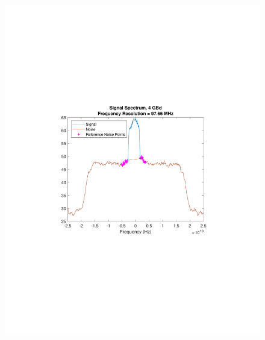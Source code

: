 \begin{refsection}
\begin{figure}[H]
	\begin{minipage}{0.43\textwidth}
		\centering
		\includegraphics[clip, trim=4cm 8cm 4cm 8cm,
		width=1\textwidth]{./sdf/m_qam_system/figures/snr/minMaxSpec/4GBdMinSpecHSNR.pdf}
		\subcaption{\label{fig:snrMinFreq_4_10_500}}
		

\end{minipage}
\end{figure}
\end{refsection}
